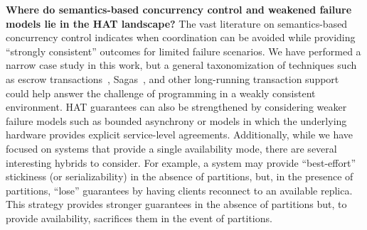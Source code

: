 \textbf{Where do semantics-based concurrency control and weakened
  failure models lie in the HAT landscape?} The vast
literature on semantics-based concurrency control indicates 
when coordination can be avoided while providing ``strongly
consistent'' outcomes for limited failure scenarios. We have performed
a narrow case study in this work, but a general taxonomization of
techniques such as escrow transactions~\cite{escrow},
Sagas~\cite{sagas}, and other long-running transaction support could
help answer the challenge of programming in a weakly consistent
environment. HAT guarantees can also be strengthened by considering
weaker failure models such as bounded asynchrony or models in which
the underlying hardware provides explicit service-level
agreements. Additionally, while we have focused on systems that
provide a single availability mode, there are several interesting
hybrids to consider. For example, a system may provide ``best-effort''
stickiness (or serializability) in the absence of partitions, but, in
the presence of partitions, ``lose'' guarantees by having clients
reconnect to an available replica. This strategy provides stronger
guarantees in the absence of partitions but, to provide availability,
sacrifices them in the event of partitions.
